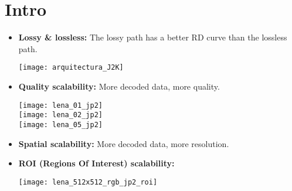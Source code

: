 \section{Intro~\cite{2002.taubman}}
\begin{itemize}
\item \textbf{Lossy \& lossless:} The lossy path has a better RD curve than the lossless path.
  \vspace{-3ex}
  \begin{center}
    \texttt{[image: arquitectura\_J2K]}
  \end{center}
\item \textbf{Quality scalability:} More decoded data, more quality.
\ifx \HCode\Undef
  \begin{flushleft}
  \end{flushleft}
  \newpage

\else
\begin{center}
        \texttt{[image: lena\_01\_jp2]}\\
        \texttt{[image: lena\_02\_jp2]}\\
        \texttt{[image: lena\_05\_jp2]}
\end{center}

\fi

\item \textbf{Spatial scalability:} More decoded data, more
  resolution.
  \begin{center}
  \end{center}
  \newpage
\item \textbf{ROI (Regions Of Interest) scalability:}
  \begin{center}
    \texttt{[image: lena\_512x512\_rgb\_jp2\_roi]}
  \end{center}
\end{itemize}

